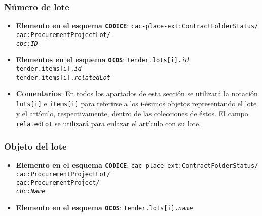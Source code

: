         \subsubsection{Número de lote}
            \begin{itemize}
                \item \textbf{Elemento en el esquema \texttt{CODICE}}:
                    \tabto{7.6cm} \texttt{cac-place-ext:ContractFolderStatus/} \\
                    \tabto{7.6cm} \texttt{cac:ProcurementProjectLot/} \\
                    \tabto{7.6cm} \texttt{\textit{cbc:ID}}
                \item \textbf{Elementos en el esquema \texttt{OCDS}}:
                    \tabto{7.6cm} \texttt{tender.lots[i].\textit{id}} \\
                    \tabto{7.6cm} \texttt{tender.items[i].\textit{id}} \\
                    \tabto{7.6cm} \texttt{tender.items[i].\textit{relatedLot}} \\
                \item \textbf{Comentarios}: En todos los apartados de esta sección se utilizará la notación \texttt{lots[i]} e \texttt{items[i]} para referirse a los i-ésimos objetos representando el lote y el artículo, respectivamente, dentro de las colecciones de éstos. El campo \texttt{relatedLot} se utilizará para enlazar el artículo con su lote.
            \end{itemize}
            
        \subsubsection{Objeto del lote}
            \begin{itemize}
                \item \textbf{Elemento en el esquema \texttt{CODICE}}:
                    \tabto{7.6cm} \texttt{cac-place-ext:ContractFolderStatus/} \\
                    \tabto{7.6cm} \texttt{cac:ProcurementProjectLot/} \\
                    \tabto{7.6cm} \texttt{cac:ProcurementProject/} \\
                    \tabto{7.6cm} \texttt{\textit{cbc:Name}}
                \item \textbf{Elemento en el esquema \texttt{OCDS}}:
                    \tabto{7.6cm} \texttt{tender.lots[i].\textit{name}}
            \end{itemize}
        
